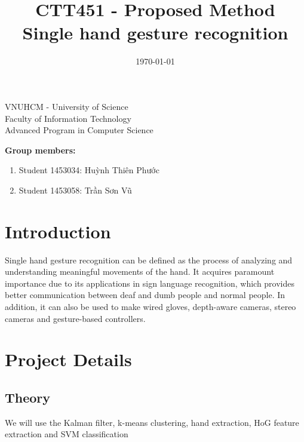 \documentclass[a4paper, 12pt]{article}
\title{CTT451 - Proposed Method\\ Single hand gesture recognition}
\date{\today}
\begin{document}
\begin{center} 
\large VNUHCM - University of Science\\
Faculty of Information Technology\\
Advanced Program in Computer Science
\end{center}

\begingroup
\let\newpage\relax
\maketitle
\endgroup

\textbf{Group members:}
\begin{enumerate}
	\item Student 1453034: Huỳnh Thiên Phước
	\item Student 1453058: Trần Sơn Vũ
\end{enumerate}

\section{Introduction}
Single hand gesture recognition can be defined as the process of analyzing and understanding meaningful movements of the hand. It acquires paramount importance due to its applications in sign language recognition, which provides better communication between deaf and dumb people and normal people. In addition, it can also be used to make wired gloves, depth-aware cameras, stereo cameras and gesture-based controllers.
\section{Project Details}

\subsection{Theory}
We will use the Kalman filter, k-means clustering, hand extraction, HoG feature extraction and SVM classification
\end{document}
